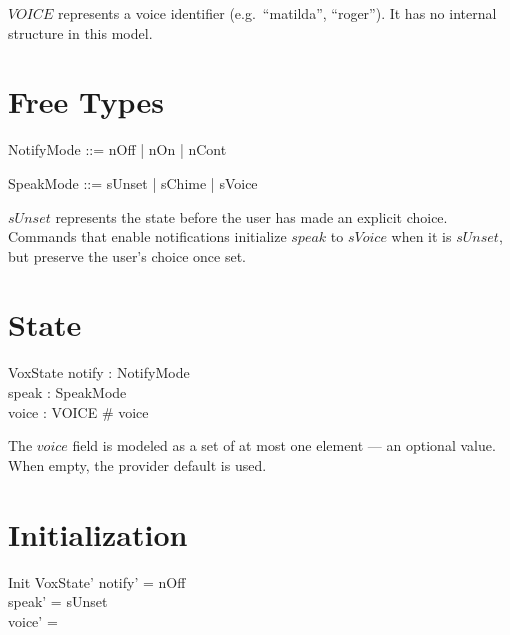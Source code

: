 \documentclass[a4paper,10pt,fleqn]{article}
\begin{document}
\begin{zed}
  [VOICE]
\end{zed}

$VOICE$ represents a voice identifier (e.g.\ ``matilda'', ``roger'').
It has no internal structure in this model.

\section{Free Types}

\begin{zed}
  NotifyMode ::= nOff | nOn | nCont
\end{zed}

\begin{zed}
  SpeakMode ::= sUnset | sChime | sVoice
\end{zed}

$sUnset$ represents the state before the user has made an
explicit choice. Commands that enable notifications initialize
$speak$ to $sVoice$ when it is $sUnset$, but preserve the
user's choice once set.

\section{State}

\begin{schema}{VoxState}
  notify : NotifyMode \\
  speak : SpeakMode \\
  voice : \power VOICE
  \where
  \# voice 
\end{schema}

The $voice$ field is modeled as a set of at most one element ---
an optional value. When empty, the provider default is used.

\section{Initialization}

\begin{schema}{Init}
  VoxState'
  \where
  notify' = nOff \\
  speak' = sUnset \\
  voice' = \emptyset
\end{schema}
\end{document}
